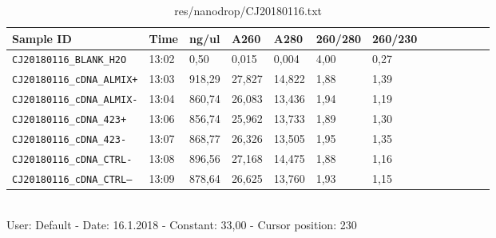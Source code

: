 \begin{table}[htbp]
\caption{res/nanodrop/CJ20180116.txt}
\label{tab:CJ20180116}
\centering
\begin{tabular}{l l l l l l l l l l l l l }
\toprule
Sample ID & Time  & ng/ul  & A260  & A280  & 260/280  & 260/230  \\ \midrule
\texttt{CJ20180116\_BLANK\_H2O} & 13:02 & 0,50 & 0,015 & 0,004 & 4,00 & 0,27 \\
\texttt{CJ20180116\_cDNA\_ALMIX+} & 13:03 & 918,29 & 27,827 & 14,822 & 1,88 & 1,39 \\
\texttt{CJ20180116\_cDNA\_ALMIX-} & 13:04 & 860,74 & 26,083 & 13,436 & 1,94 & 1,19 \\
\texttt{CJ20180116\_cDNA\_423+} & 13:06 & 856,74 & 25,962 & 13,733 & 1,89 & 1,30 \\
\texttt{CJ20180116\_cDNA\_423-} & 13:07 & 868,77 & 26,326 & 13,505 & 1,95 & 1,35 \\
\texttt{CJ20180116\_cDNA\_CTRL-} & 13:08 & 896,56 & 27,168 & 14,475 & 1,88 & 1,16 \\
\texttt{CJ20180116\_cDNA\_CTRL--} & 13:09 & 878,64 & 26,625 & 13,760 & 1,93 & 1,15 \\

\bottomrule
\end{tabular}
\\
User: Default - Date: 16.1.2018 - Constant: 33,00 - Cursor position: 230 \
\end{table}
